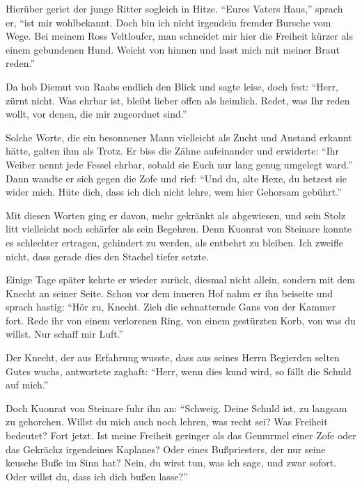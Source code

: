 Hierüber geriet der junge Ritter sogleich in Hitze. \enquote{Eures Vaters Haus,} sprach er, \enquote{ist mir wohlbekannt. Doch bin ich nicht irgendein fremder Bursche vom Wege. Bei meinem Ross \gls{Veltloufer}, man schneidet mir hier die \gls{Freiheit} kürzer als einem gebundenen Hund. Weicht von hinnen und lasst mich mit meiner Braut reden.}

Da hob \gls{Diemut von Raabs} endlich den Blick und sagte leise, doch fest: \enquote{Herr, zürnt nicht. Was ehrbar ist, bleibt lieber offen als heimlich. Redet, was Ihr reden wollt, vor denen, die mir zugeordnet sind.}

Solche Worte, die ein besonnener Mann vielleicht als Zucht und Anstand erkannt hätte, galten ihm als Trotz. Er biss die Zähne aufeinander und erwiderte: \enquote{Ihr Weiber nennt jede Fessel ehrbar, sobald sie Euch nur lang genug umgelegt ward.} Dann wandte er sich gegen die Zofe und rief: \enquote{Und du, alte Hexe, du hetzest sie wider mich. Hüte dich, dass ich dich nicht lehre, wem hier Gehorsam gebührt.}

Mit diesen Worten ging er davon, mehr gekränkt als abgewiesen, und sein Stolz litt vielleicht noch schärfer als sein Begehren. Denn \gls{Kuonrat von Steinare} konnte es schlechter ertragen, gehindert zu werden, als entbehrt zu bleiben. Ich zweifle nicht, dass gerade dies den Stachel tiefer setzte.

Einige Tage später kehrte er wieder zurück, diesmal nicht allein, sondern mit dem \gls{Knecht} an seiner Seite. Schon vor dem inneren Hof nahm er ihn beiseite und sprach hastig: \enquote{Hör zu, Knecht. Zieh die schnatternde Gans von der Kammer fort. Rede ihr von einem verlorenen Ring, von einem gestürzten Korb, von was du willst. Nur schaff mir Luft.}

Der \gls{Knecht}, der aus Erfahrung wusste, dass aus seines Herrn Begierden selten Gutes wuchs, antwortete zaghaft: \enquote{Herr, wenn dies kund wird, so fällt die Schuld auf mich.}

Doch \gls{Kuonrat von Steinare} fuhr ihn an: \enquote{Schweig. Deine Schuld ist, zu langsam zu gehorchen. Willst du mich auch noch lehren, was recht sei? Was \gls{Freiheit} bedeutet? Fort jetzt. Ist meine \gls{Freiheit} geringer als das Gemurmel einer Zofe oder das Gekrächz irgendeines Kaplanes? Oder eines Bußpriesters, der nur seine keusche Buße im Sinn hat? Nein, du wirst tun, was ich sage, und zwar sofort. Oder willst du, dass ich dich bußen lasse?}

